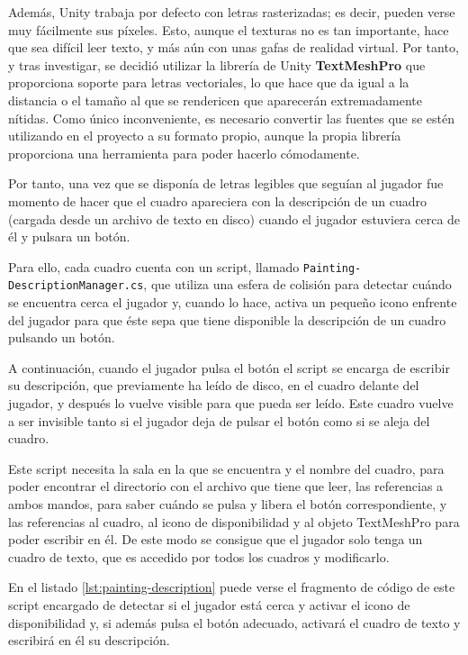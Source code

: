 Además, Unity trabaja por defecto con letras rasterizadas; es decir, pueden verse muy fácilmente sus píxeles. Esto, aunque el texturas no es tan importante, hace que sea difícil leer texto, y más aún con unas gafas de realidad virtual. Por tanto, y tras investigar, se decidió utilizar la librería de Unity \textbf{TextMeshPro} que proporciona soporte para letras vectoriales, lo que hace que da igual a la distancia o el tamaño al que se rendericen que aparecerán extremadamente nítidas. Como único inconveniente, es necesario convertir las fuentes que se estén utilizando en el proyecto a su formato propio, aunque la propia librería proporciona una herramienta para poder hacerlo cómodamente.

Por tanto, una vez que se disponía de letras legibles que seguían al jugador fue momento de hacer que el cuadro apareciera con la descripción de un cuadro (cargada desde un archivo de texto en disco) cuando el jugador estuviera cerca de él y pulsara un botón.

Para ello, cada cuadro cuenta con un script, llamado \texttt{Painting-} \texttt{DescriptionManager.cs}, que utiliza una esfera de colisión para detectar cuándo se encuentra cerca el jugador y, cuando lo hace, activa un pequeño icono enfrente del jugador para que éste sepa que tiene disponible la descripción de un cuadro pulsando un botón.

A continuación, cuando el jugador pulsa el botón el script se encarga de escribir su descripción, que previamente ha leído de disco, en el cuadro delante del jugador, y después lo vuelve visible para que pueda ser leído. Este cuadro vuelve a ser invisible tanto si el jugador deja de pulsar el botón como si se aleja del cuadro.

Este script necesita la sala en la que se encuentra y el nombre del cuadro, para poder encontrar el directorio con el archivo que tiene que leer, las referencias a ambos mandos, para saber cuándo se pulsa y libera el botón correspondiente, y las referencias al cuadro, al icono de disponibilidad y al objeto TextMeshPro para poder escribir en él. De este modo se consigue que el jugador solo tenga un cuadro de texto, que es accedido por todos los cuadros y modificarlo.

En el listado \ref{lst:painting-description} puede verse el fragmento de código de este script encargado de detectar si el jugador está cerca y activar el icono de disponibilidad y, si además pulsa el botón adecuado, activará el cuadro de texto y escribirá en él su descripción.

